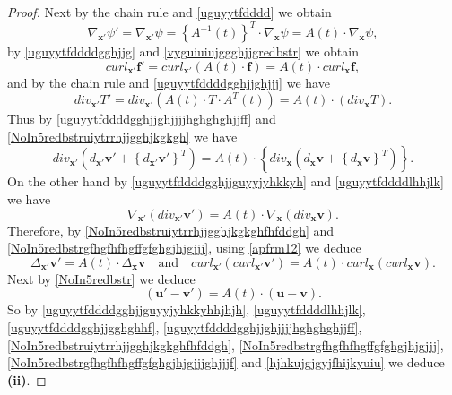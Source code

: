 \documentclass{article}
\theoremstyle{definition}
\theoremstyle{remark}
\renewcommand{\vec}[1]{\mathbf{#1}}
\newcommand{\er}{\eqref}
\newcommand{\er}{\eqref}
\begin{document}
\begin{proof}
 Next by the chain rule and \er{uguyytfdddd} we obtain
\begin{equation}\label{uguyytfddddlhhjlk}
\nabla_{\vec x'}\psi'=\nabla_{\vec
x'}\psi=\left\{A^{-1}(t)\right\}^T\cdot\nabla_{\vec
x}\psi=A(t)\cdot\nabla_{\vec x}\psi,
\end{equation}
by \er{uguyytfddddgghjjg} and \er{vyguiuiujggghjjgredbstr} we obtain
\begin{equation}\label{uguyytfddddgghjjgghghhf}
curl_{\vec x'}\vec f'=curl_{\vec x'}\left(A(t)\cdot\vec
f\right)=A(t)\cdot curl_{\vec x}\vec f,
\end{equation}
and by the chain rule and \er{uguyytfddddgghjjghjjj} we have
\begin{equation}\label{uguyytfddddgghjjghjjjjhghghghjjff}
div_{\vec x'}T'=div_{\vec x'}\left(A(t)\cdot T\cdot
A^T(t)\right)=A(t)\cdot\left(div_{\vec x}T\right).
\end{equation}
Thus by \er{uguyytfddddgghjjghjjjjhghghghjjff} and
\er{NoIn5redbstruiytrrhjjgghjkgkgh} we have
\begin{equation}
\label{NoIn5redbstruiytrrhjjgghjkgkghfhfddgh} div_{\vec
x'}\left(d_{\vec x'}\vec v'+\left\{d_{\vec x'}\vec
v'\right\}^T\right)=A(t)\cdot\left\{div_{\vec x}\left(d_{\vec x}\vec
v+\left\{d_{\vec x}\vec v\right\}^T\right)\right\}.
\end{equation}
On the other hand by \er{uguyytfddddgghjjguyyjyhkkyh} and
\er{uguyytfddddlhhjlk} we have
\begin{equation}
\label{NoIn5redbstrgfhgfhfhgffgfghgjhjgjjj} \nabla_{\vec
x'}\left(div_{\vec x'}\vec v'\right)=A(t)\cdot\nabla_{\vec
x}\left(div_{\vec x}\vec v\right).
\end{equation}
Therefore, by \er{NoIn5redbstruiytrrhjjgghjkgkghfhfddgh} and
\er{NoIn5redbstrgfhgfhfhgffgfghgjhjgjjj}, using \er{apfrm12} we
deduce
\begin{equation}
\label{NoIn5redbstrgfhgfhfhgffgfghgjhjgjjjghjjjf} \Delta_{\vec
x'}\vec v'=A(t)\cdot\Delta_{\vec x}\vec v \quad\text{and}\quad
curl_{\vec x'}\left(curl_{\vec x'}\vec v'\right)=A(t)\cdot
curl_{\vec x}\left(curl_{\vec x}\vec v\right).
\end{equation}
Next by \er{NoIn5redbstr} we deduce
\begin{equation}\label{hjhkujgjgyjfhijkyuiu}
(\vec u'-\vec v')=A(t)\cdot(\vec u-\vec v).
\end{equation}
So by \er{uguyytfddddgghjjguyyjyhkkyhhjhjh}, \er{uguyytfddddlhhjlk},
\er{uguyytfddddgghjjgghghhf},
\er{uguyytfddddgghjjghjjjjhghghghjjff},
\er{NoIn5redbstruiytrrhjjgghjkgkghfhfddgh},
\er{NoIn5redbstrgfhgfhfhgffgfghgjhjgjjj},
\er{NoIn5redbstrgfhgfhfhgffgfghgjhjgjjjghjjjf} and
\er{hjhkujgjgyjfhijkyuiu} we deduce {\bf(ii)}.



\end{proof}
\end{document}
